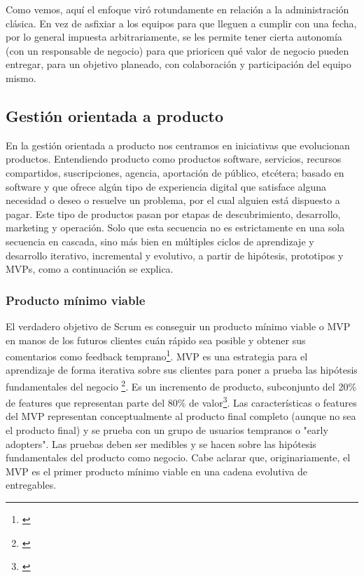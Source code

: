 Como vemos, aquí el enfoque viró rotundamente en relación a la administración clásica. En vez de asfixiar a los equipos para que lleguen a cumplir con una fecha, por lo general impuesta arbitrariamente, se les permite tener cierta autonomía (con un responsable de negocio) para que prioricen qué valor de negocio pueden entregar, para un objetivo planeado, con colaboración y participación del equipo mismo.

\subsection{Gestión orientada a producto}

En la gestión orientada a producto nos centramos en iniciativas que evolucionan productos. Entendiendo producto como productos software, servicios, recursos compartidos, suscripciones, agencia, aportación de público, etcétera; basado en software y que ofrece algún tipo de experiencia digital que satisface alguna necesidad o deseo o resuelve un problema, por el cual alguien está dispuesto a pagar. Este tipo de productos pasan por etapas de descubrimiento, desarrollo, marketing y operación. Solo que esta secuencia no es estrictamente en una sola secuencia en cascada, sino más bien en múltiples ciclos de aprendizaje y desarrollo iterativo, incremental y evolutivo, a partir de hipótesis, prototipos y MVPs, como a continuación se explica. 

\subsubsection{Producto mínimo viable}

El verdadero objetivo de Scrum es conseguir un producto mínimo viable o MVP en manos de los futuros clientes cuán rápido sea posible y obtener sus comentarios como feedback temprano\footnote{\cite{Jeff-Sutherland-2016}}. MVP es una estrategia para el aprendizaje de forma iterativa sobre sus clientes para poner a prueba las hipótesis fundamentales del negocio \footnote{\cite{Greg-Gehrich-2012}}. Es un incremento de producto, subconjunto del 20\% de features que representan parte del 80\% de valor\footnote{\cite{Jeff-Sutherland-2016}}. Las características o features del MVP representan conceptualmente al producto final completo (aunque no sea el producto final) y se prueba con un grupo de usuarios tempranos o "early adopters". Las pruebas deben ser medibles y se hacen sobre las hipótesis fundamentales del producto como negocio. Cabe aclarar que, originariamente, el MVP es el primer producto mínimo viable en una cadena evolutiva de entregables. 

